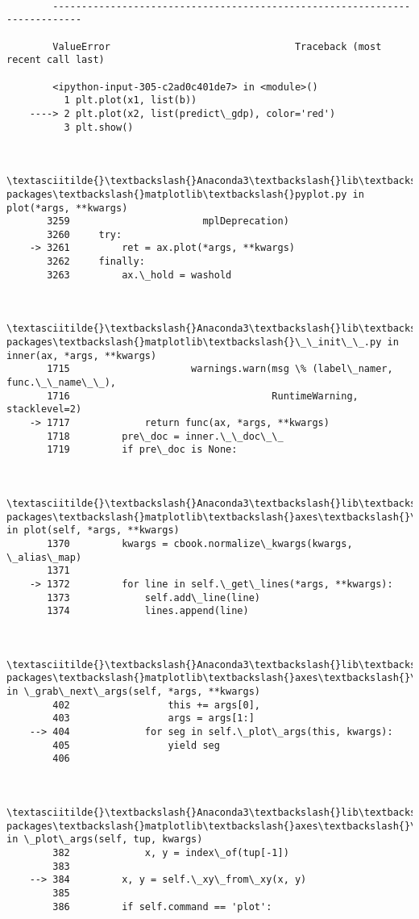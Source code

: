 \documentclass[11pt]{article}
\begin{document}
    \begin{Verbatim}[commandchars=\\\{\}]

        ---------------------------------------------------------------------------

        ValueError                                Traceback (most recent call last)

        <ipython-input-305-c2ad0c401de7> in <module>()
          1 plt.plot(x1, list(b))
    ----> 2 plt.plot(x2, list(predict\_gdp), color='red')
          3 plt.show()
    

        \textasciitilde{}\textbackslash{}Anaconda3\textbackslash{}lib\textbackslash{}site-packages\textbackslash{}matplotlib\textbackslash{}pyplot.py in plot(*args, **kwargs)
       3259                       mplDeprecation)
       3260     try:
    -> 3261         ret = ax.plot(*args, **kwargs)
       3262     finally:
       3263         ax.\_hold = washold
    

        \textasciitilde{}\textbackslash{}Anaconda3\textbackslash{}lib\textbackslash{}site-packages\textbackslash{}matplotlib\textbackslash{}\_\_init\_\_.py in inner(ax, *args, **kwargs)
       1715                     warnings.warn(msg \% (label\_namer, func.\_\_name\_\_),
       1716                                   RuntimeWarning, stacklevel=2)
    -> 1717             return func(ax, *args, **kwargs)
       1718         pre\_doc = inner.\_\_doc\_\_
       1719         if pre\_doc is None:
    

        \textasciitilde{}\textbackslash{}Anaconda3\textbackslash{}lib\textbackslash{}site-packages\textbackslash{}matplotlib\textbackslash{}axes\textbackslash{}\_axes.py in plot(self, *args, **kwargs)
       1370         kwargs = cbook.normalize\_kwargs(kwargs, \_alias\_map)
       1371 
    -> 1372         for line in self.\_get\_lines(*args, **kwargs):
       1373             self.add\_line(line)
       1374             lines.append(line)
    

        \textasciitilde{}\textbackslash{}Anaconda3\textbackslash{}lib\textbackslash{}site-packages\textbackslash{}matplotlib\textbackslash{}axes\textbackslash{}\_base.py in \_grab\_next\_args(self, *args, **kwargs)
        402                 this += args[0],
        403                 args = args[1:]
    --> 404             for seg in self.\_plot\_args(this, kwargs):
        405                 yield seg
        406 
    

        \textasciitilde{}\textbackslash{}Anaconda3\textbackslash{}lib\textbackslash{}site-packages\textbackslash{}matplotlib\textbackslash{}axes\textbackslash{}\_base.py in \_plot\_args(self, tup, kwargs)
        382             x, y = index\_of(tup[-1])
        383 
    --> 384         x, y = self.\_xy\_from\_xy(x, y)
        385 
        386         if self.command == 'plot':
    


\end{Verbatim}
\end{document}
